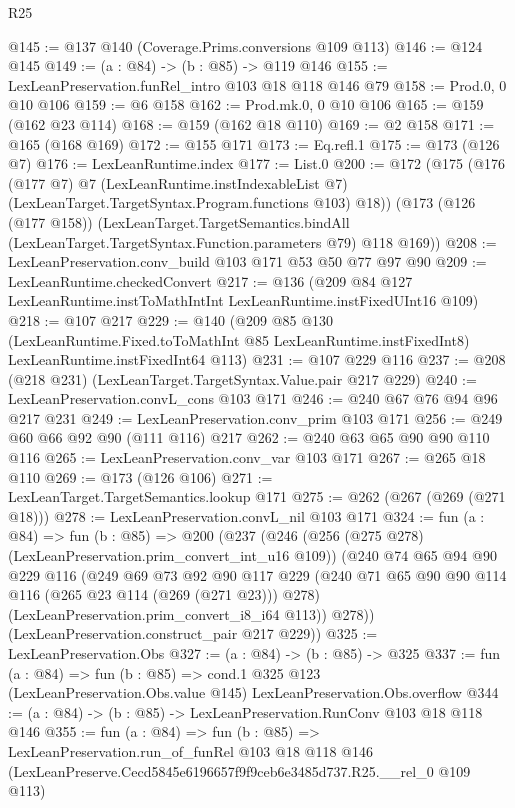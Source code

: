 \begin{lexlean}{R25}
\begin{coremodule}
@145 := @137 @140 (Coverage.Prims.conversions @109 @113)
@146 := @124 @145
@149 := (a : @84) -> (b : @85) -> @119 @146
@155 := LexLeanPreservation.funRel_intro @103 @18 @118 @146 @79
@158 := Prod.{0, 0} @10 @106
@159 := @6 @158
@162 := Prod.mk.{0, 0} @10 @106
@165 := @159 (@162 @23 @114)
@168 := @159 (@162 @18 @110)
@169 := @2 @158
@171 := @165 (@168 @169)
@172 := @155 @171
@173 := Eq.refl.{1}
@175 := @173 (@126 @7)
@176 := LexLeanRuntime.index
@177 := List.{0}
@200 := @172
    (@175
      (@176
        (@177 @7)
        @7
        (LexLeanRuntime.instIndexableList @7)
        (LexLeanTarget.TargetSyntax.Program.functions @103)
        @18))
    (@173
      (@126 (@177 @158))
      (LexLeanTarget.TargetSemantics.bindAll
        (LexLeanTarget.TargetSyntax.Function.parameters @79)
        @118
        @169))
@208 := LexLeanPreservation.conv_build @103 @171 @53 @50 @77 @97 @90
@209 := LexLeanRuntime.checkedConvert
@217 := @136 (@209 @84 @127 LexLeanRuntime.instToMathIntInt LexLeanRuntime.instFixedUInt16 @109)
@218 := @107 @217
@229 := @140
    (@209
      @85
      @130
      (LexLeanRuntime.Fixed.toToMathInt @85 LexLeanRuntime.instFixedInt8)
      LexLeanRuntime.instFixedInt64
      @113)
@231 := @107 @229 @116
@237 := @208 (@218 @231) (LexLeanTarget.TargetSyntax.Value.pair @217 @229)
@240 := LexLeanPreservation.convL_cons @103 @171
@246 := @240 @67 @76 @94 @96 @217 @231
@249 := LexLeanPreservation.conv_prim @103 @171
@256 := @249 @60 @66 @92 @90 (@111 @116) @217
@262 := @240 @63 @65 @90 @90 @110 @116
@265 := LexLeanPreservation.conv_var @103 @171
@267 := @265 @18 @110
@269 := @173 (@126 @106)
@271 := LexLeanTarget.TargetSemantics.lookup @171
@275 := @262 (@267 (@269 (@271 @18)))
@278 := LexLeanPreservation.convL_nil @103 @171
@324 := fun (a : @84) =>
  fun (b : @85) =>
  @200
    (@237
      (@246
        (@256 (@275 @278) (LexLeanPreservation.prim_convert_int_u16 @109))
        (@240
          @74
          @65
          @94
          @90
          @229
          @116
          (@249
            @69
            @73
            @92
            @90
            @117
            @229
            (@240 @71 @65 @90 @90 @114 @116 (@265 @23 @114 (@269 (@271 @23))) @278)
            (LexLeanPreservation.prim_convert_i8_i64 @113))
          @278))
      (LexLeanPreservation.construct_pair @217 @229))
@325 := LexLeanPreservation.Obs
@327 := (a : @84) -> (b : @85) -> @325
@337 := fun (a : @84) =>
  fun (b : @85) =>
  cond.{1} @325 @123 (LexLeanPreservation.Obs.value @145) LexLeanPreservation.Obs.overflow
@344 := (a : @84) -> (b : @85) -> LexLeanPreservation.RunConv @103 @18 @118 @146
@355 := fun (a : @84) =>
  fun (b : @85) =>
  LexLeanPreservation.run_of_funRel
    @103
    @18
    @118
    @146
    (LexLeanPreserve.Cecd5845e6196657f9f9ceb6e3485d737.R25.__rel_0 @109 @113)
\end{coremodule}
\end{lexlean}
